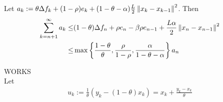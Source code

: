 \documentclass[english,12pt,a4paper]{article}
\begin{document}
%
Let $a_k:= \theta \Delta f_{k} +(1-\rho)e_{k}  + (1-\theta-\alpha)\frac{ L}{2} \left\|x_{k}-x_{k-1}\right\|^2$. Then
%
\begin{align*}
\sum_{k=n+1}^{\infty} a_k \le& (1-\theta) \Delta f_n + \rho e_n -\beta\rho e_{n-1} + \frac{ L\alpha}{2}\left\|x_n-x_{n-1}\right\|^2\\
\le& \max\left\{\frac{1-\theta}{\theta}, \frac{\rho}{1-\rho},  \frac{\alpha}{1-\theta-\alpha}\right\} a_n
\end{align*}
%










\dotfill WORKS \dotfill\\



Let 
%
\begin{align*}
 u_k := \frac{1}{\theta}\left(y_k-(1-\theta)x_k\right) = x_k + \frac{y_k-x_k}{\theta}
\end{align*}
%
\end{document}
